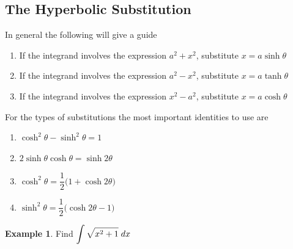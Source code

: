 \documentclass[11pt,a4paper]{article}
\theoremstyle{definition}
\newtheorem{exa}[thm]{Example}
\begin{document}
\subsection{The Hyperbolic Substitution}
In general the following will give a guide

\begin{enumerate}
\item If the integrand involves the expression $a^2 + x^2$, substitute $x = a\sinh\theta$

\item If the integrand involves the expression $a^2 - x^2$, substitute $x = a\tanh \theta$

\item If the integrand involves the expression $x^2 - a^2$, substitute $x = a\cosh \theta$
\end{enumerate}

For the types of substitutions the most important identities to use are 
\begin{enumerate}
\item $\cosh^2\theta - \sinh^2\theta = 1$

\item $2\sinh \theta \cosh \theta = \sinh 2 \theta$

\item $\cosh^2\theta = \dfrac{1}{2}\big(1 + \cosh 2 \theta\big)$

\item $\sinh^2\theta = \dfrac{1}{2}\big( \cosh 2 \theta - 1\big)$
\end{enumerate}

\begin{exa}


Find $\displaystyle{\int \sqrt{x^2 + 1}\hspace{0.1cm}dx}$
\end{exa}
\end{document}
